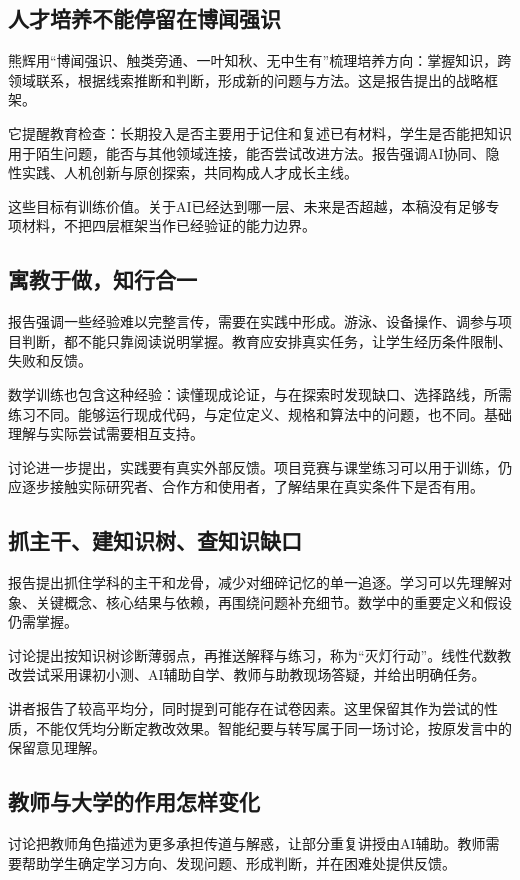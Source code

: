 \documentclass[UTF8,zihao=-4,fontset=fandol,oneside,openany]{ctexbook}
\begin{document}
\subsection*{人才培养不能停留在博闻强识}
熊辉用“博闻强识、触类旁通、一叶知秋、无中生有”梳理培养方向：掌握知识，跨领域联系，根据线索推断和判断，形成新的问题与方法\cite{xiong}。这是报告提出的战略框架。

它提醒教育检查：长期投入是否主要用于记住和复述已有材料，学生是否能把知识用于陌生问题，能否与其他领域连接，能否尝试改进方法。报告强调AI协同、隐性实践、人机创新与原创探索，共同构成人才成长主线。

这些目标有训练价值。关于AI已经达到哪一层、未来是否超越，本稿没有足够专项材料，不把四层框架当作已经验证的能力边界。

\subsection*{寓教于做，知行合一}
报告强调一些经验难以完整言传，需要在实践中形成。游泳、设备操作、调参与项目判断，都不能只靠阅读说明掌握。教育应安排真实任务，让学生经历条件限制、失败和反馈。

数学训练也包含这种经验：读懂现成论证，与在探索时发现缺口、选择路线，所需练习不同。能够运行现成代码，与定位定义、规格和算法中的问题，也不同。基础理解与实际尝试需要相互支持。

讨论进一步提出，实践要有真实外部反馈。项目竞赛与课堂练习可以用于训练，仍应逐步接触实际研究者、合作方和使用者，了解结果在真实条件下是否有用\cite{discussion}。

\subsection*{抓主干、建知识树、查知识缺口}
报告提出抓住学科的主干和龙骨，减少对细碎记忆的单一追逐。学习可以先理解对象、关键概念、核心结果与依赖，再围绕问题补充细节。数学中的重要定义和假设仍需掌握。

讨论提出按知识树诊断薄弱点，再推送解释与练习，称为“灭灯行动”。线性代数教改尝试采用课初小测、AI辅助自学、教师与助教现场答疑，并给出明确任务。

讲者报告了较高平均分，同时提到可能存在试卷因素。这里保留其作为尝试的性质，不能仅凭均分断定教改效果。智能纪要与转写属于同一场讨论，按原发言中的保留意见理解\cite{discussion,summary}。

\subsection*{教师与大学的作用怎样变化}
讨论把教师角色描述为更多承担传道与解惑，让部分重复讲授由AI辅助。教师需要帮助学生确定学习方向、发现问题、形成判断，并在困难处提供反馈。
\end{document}
